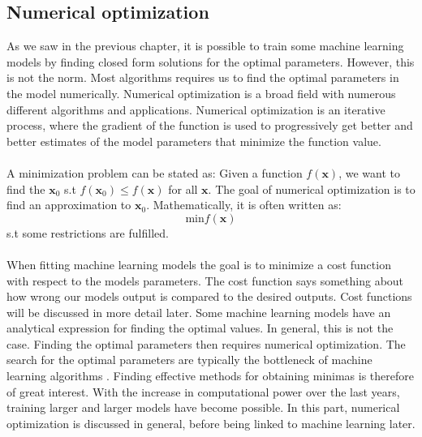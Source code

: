 \subsection{Numerical optimization}
As we saw in the previous chapter, it is possible to train some machine learning models by finding closed form solutions for the optimal parameters. However, this is not the norm. Most algorithms requires us to find the optimal parameters in the model numerically. Numerical optimization is a broad field with numerous different algorithms and applications. Numerical optimization is an iterative process, where the gradient of the function is used to progressively get better and better estimates of the model parameters that minimize the function value. 
\\
\\
A minimization problem can be stated as: Given a function $f(\boldsymbol{x})$, we want to find the $\boldsymbol{x}_0$ s.t $f(\boldsymbol{x}_0) \leq f(\boldsymbol{x})$ for all $\boldsymbol{x}$. The goal of numerical optimization is to find an approximation to $\boldsymbol{x}_0$. Mathematically, it is often written as:
\begin{equation}
    \text{min} f(\boldsymbol{x})
\end{equation}
s.t some restrictions are fulfilled.
\\
\\
When fitting machine learning models the goal is to minimize a cost function with respect to the models parameters. The cost function says something about how wrong our models output is compared to the desired outputs. Cost functions will be discussed in more detail later. Some machine learning models have an analytical expression for finding the optimal values. In general, this is not the case.
Finding the optimal parameters then requires numerical optimization. The search for the optimal parameters are typically the bottleneck of machine learning algorithms \cite{Hands-On}. Finding effective methods for obtaining minimas is therefore of great interest. With the increase in computational power over the last years, training larger and larger models have become possible. In this part, numerical optimization is discussed in general, before being linked to machine learning later. 
